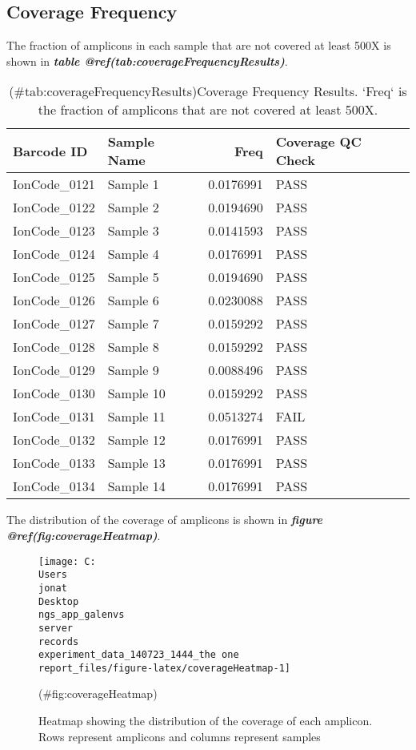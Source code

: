 \documentclass[
]{article}
\begin{document}
\hypertarget{coverage-frequency}{%
\subsection{Coverage Frequency}\label{coverage-frequency}}

The fraction of amplicons in each sample that are not covered at least 500X is shown in \textbf{\emph{table @ref(tab:coverageFrequencyResults)}}.

\begin{longtable}[t]{llrl}
\caption{(\#tab:coverageFrequencyResults)Coverage Frequency Results. `Freq` is the fraction of amplicons that are not covered at least 500X.}\\
\toprule
Barcode ID & Sample Name & Freq & Coverage QC Check\\
\midrule
IonCode\_0121 & Sample 1 & 0.0176991 & PASS\\
IonCode\_0122 & Sample 2 & 0.0194690 & PASS\\
IonCode\_0123 & Sample 3 & 0.0141593 & PASS\\
IonCode\_0124 & Sample 4 & 0.0176991 & PASS\\
IonCode\_0125 & Sample 5 & 0.0194690 & PASS\\
\addlinespace
IonCode\_0126 & Sample 6 & 0.0230088 & PASS\\
IonCode\_0127 & Sample 7 & 0.0159292 & PASS\\
IonCode\_0128 & Sample 8 & 0.0159292 & PASS\\
IonCode\_0129 & Sample 9 & 0.0088496 & PASS\\
IonCode\_0130 & Sample 10 & 0.0159292 & PASS\\
\addlinespace
IonCode\_0131 & Sample 11 & 0.0513274 & FAIL\\
IonCode\_0132 & Sample 12 & 0.0176991 & PASS\\
IonCode\_0133 & Sample 13 & 0.0176991 & PASS\\
IonCode\_0134 & Sample 14 & 0.0176991 & PASS\\
\bottomrule
\end{longtable}

The distribution of the coverage of amplicons is shown in \textbf{\emph{figure @ref(fig:coverageHeatmap)}}.

\begin{figure}
\texttt{[image: C:\\Users\\jonat\\Desktop\\ngs\_app\_galenvs\\server\\records\\experiment\_data\_140723\_1444\_the one\\report\_files/figure-latex/coverageHeatmap-1]} \caption[Coverage Heatmap]{Heatmap showing the distribution of the coverage of each amplicon. Rows represent amplicons and columns represent samples}(\#fig:coverageHeatmap)
\end{figure}
\end{document}
